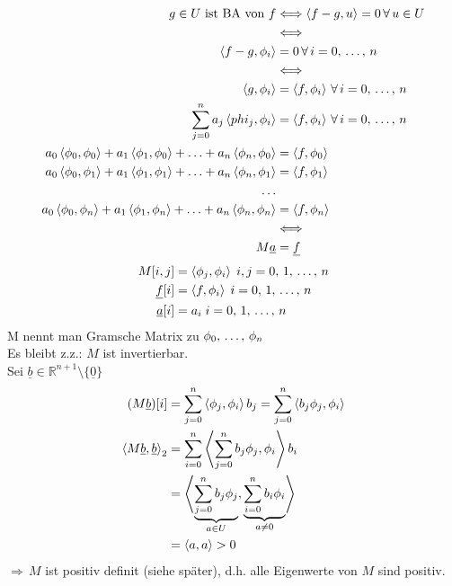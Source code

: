 \begin{align*}
  g \in U \text{ ist BA von } f &\Longleftrightarrow \left\langle f - g, u \right\rangle = 0\, \forall\, u \in U\\
  &\Longleftrightarrow\\
  \left\langle f-g, \phi_i \right\rangle &= 0\, \forall\, i=0,\,\ldots,\,n\\
  &\Longleftrightarrow\\
  \left\langle g, \phi_i \right\rangle &= \left\langle f, \phi_i \right\rangle\, \forall\, i=0,\,\ldots,\,n\\
  \sum\limits_{j=0}^{n}{a_j\left\langle phi_j, \phi_i \right\rangle} &= \left\langle f, \phi_i \right\rangle\, \forall\, i=0,\,\ldots,\,n\\
  a_0\left\langle \phi_0, \phi_0 \right\rangle + a_1\left\langle \phi_1, \phi_0 \right\rangle + \ldots + a_n\left\langle \phi_n, \phi_0 \right\rangle &= \left\langle f, \phi_0 \right\rangle\\
    a_0\left\langle \phi_0, \phi_1 \right\rangle + a_1\left\langle \phi_1, \phi_1 \right\rangle + \ldots + a_n\left\langle \phi_n, \phi_1 \right\rangle &= \left\langle f, \phi_1 \right\rangle\\
  \ldots\\
  a_0\left\langle \phi_0, \phi_n \right\rangle + a_1\left\langle \phi_1, \phi_n \right\rangle + \ldots + a_n\left\langle \phi_n, \phi_n \right\rangle &= \left\langle f, \phi_n \right\rangle\\
  &\Longleftrightarrow\\
  M\underline{a} &= \underline{f}
\end{align*}
\begin{align*}
  M[i,j] &= \left\langle \phi_j,  \phi_i \right\rangle\; i,j = 0,\,1,\,\ldots,\,n\\
    \underline{f}[i] &= \left\langle f,  \phi_i \right\rangle\; i = 0,\,1,\,\ldots,\,n\\
  \underline{a}[i] &= a_i\; i = 0,\,1,\,\ldots,\,n\\
\end{align*}
M nennt man Gramsche Matrix zu $\phi_0,\,\ldots,\,\phi_n$\\
Es bleibt z.z.: $M$ ist invertierbar.\\
Sei $\underline{b} \in \mathbb{R}^{n+1} \setminus \{\underline{0}\}$
\begin{align*}
  (M \underline{b})[i] &= \sum\limits_{j=0}^{n}{\left\langle \phi_j, \phi_i \right\rangle b_j} = \sum\limits_{j=0}^{n}{\left\langle b_j\phi_j, \phi_i \right\rangle}\\
  \left\langle M \underline{b}, \underline{b} \right\rangle_2 &= \sum\limits_{i=0}^{n}{\left\langle \sum\limits_{j=0}^{n}{b_j\phi_j}, \phi_i \right\rangle b_i}\\
  &= \left\langle \underbrace{\sum\limits_{j=0}^{n}{b_j\phi_j}}_{a \in U}, \underbrace{\sum\limits_{i=0}^{n}{b_i\phi_i}}_{a \neq 0} \right\rangle\\
  &= \left\langle a, a \right\rangle > 0
\end{align*}
$\Rightarrow\,M$ ist positiv definit (siehe später), d.h. alle Eigenwerte von $M$ sind positiv.\\
